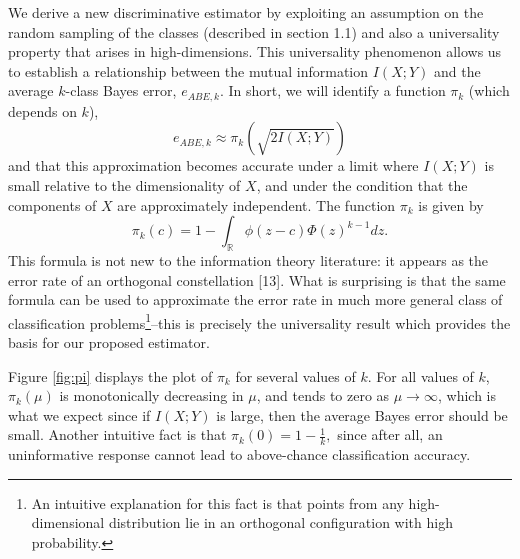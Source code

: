 \documentclass{article}
\begin{document}
We derive a new discriminative estimator by exploiting an assumption on the
random sampling of the classes (described in section 1.1) and also
a universality property that arises in
high-dimensions.  This universality phenomenon allows us to establish
a relationship between the mutual information $I(X; Y)$ and the
average $k$-class Bayes error, $e_{ABE, k}$.  In short, we will
identify a function $\pi_k$ (which depends on $k$),
\begin{equation}\label{abepi}
e_{ABE, k} \approx \pi_k(\sqrt{2 I(X; Y)})
\end{equation}
and that this approximation becomes accurate under a limit where $I(X;
Y)$ is small relative to the dimensionality of $X$, and under the
condition that the components of $X$ are approximately independent.
The function $\pi_k$ is given by
\[
\pi_k(c) = 1 - \int_{\mathbb{R}} \phi(z - c)  \Phi(z)^{k-1} dz.
\]
This formula is not new to the information theory literature: it
appears as the error rate of an orthogonal constellation [13].  What
is surprising is that the same formula can be used to approximate the
error rate in much more general class of classification
problems\footnote{An intuitive explanation for this fact is that
  points from any high-dimensional distribution lie in an orthogonal
  configuration with high probability.}--this is precisely the
universality result which provides the basis for our proposed
estimator.

Figure \ref{fig:pi} displays the plot of $\pi_k$ for several values of
$k$.  For all values of $k$, $\pi_k(\mu)$ is monotonically decreasing
in $\mu$, and tends to zero as $\mu \to \infty$, which is what we
expect since if $I(X; Y)$ is large, then the average Bayes error
should be small.  Another intuitive fact is that $ \pi_k(0) = 1 -
\frac{1}{k}, $ since after all, an uninformative response cannot lead
to above-chance classification accuracy.
\end{document}
